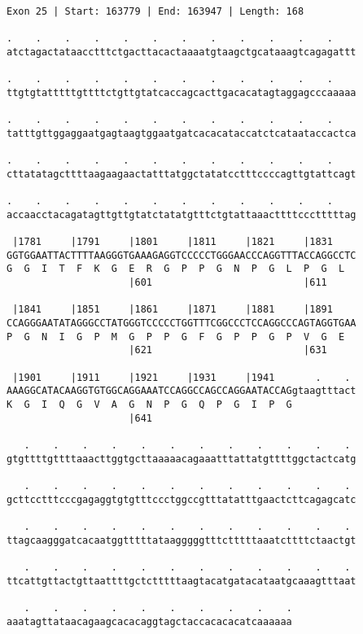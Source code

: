\documentclass{article}
\begin{document}
\newpage
\begin{Verbatim}
Exon 25 | Start: 163779 | End: 163947 | Length: 168
 
.    .    .    .    .    .    .    .    .    .    .    .    
atctagactataacctttctgacttacactaaaatgtaagctgcataaagtcagagattt
  
.    .    .    .    .    .    .    .    .    .    .    .    
ttgtgtatttttgttttctgttgtatcaccagcacttgacacatagtaggagcccaaaaa
  
.    .    .    .    .    .    .    .    .    .    .    .    
tatttgttggaggaatgagtaagtggaatgatcacacataccatctcataataccactca
  
.    .    .    .    .    .    .    .    .    .    .    .    
cttatatagcttttaagaagaactatttatggctatatcctttccccagttgtattcagt
  
.    .    .    .    .    .    .    .    .    .    .    .    
accaacctacagatagttgttgtatctatatgtttctgtattaaacttttccctttttag
  
 |1781     |1791     |1801     |1811     |1821     |1831    
GGTGGAATTACTTTTAAGGGTGAAAGAGGTCCCCCTGGGAACCCAGGTTTACCAGGCCTC
G  G  I  T  F  K  G  E  R  G  P  P  G  N  P  G  L  P  G  L  
                     |601                          |611     
  
 |1841     |1851     |1861     |1871     |1881     |1891    
CCAGGGAATATAGGGCCTATGGGTCCCCCTGGTTTCGGCCCTCCAGGCCCAGTAGGTGAA
P  G  N  I  G  P  M  G  P  P  G  F  G  P  P  G  P  V  G  E  
                     |621                          |631     
  
 |1901     |1911     |1921     |1931     |1941       .    . 
AAAGGCATACAAGGTGTGGCAGGAAATCCAGGCCAGCCAGGAATACCAGgtaagtttact
K  G  I  Q  G  V  A  G  N  P  G  Q  P  G  I  P  G           
                     |641                                   
  
   .    .    .    .    .    .    .    .    .    .    .    . 
gtgttttgttttaaacttggtgcttaaaaacagaaatttattatgttttggctactcatg
  
   .    .    .    .    .    .    .    .    .    .    .    . 
gcttcctttcccgagaggtgtgtttccctggccgtttatatttgaactcttcagagcatc
  
   .    .    .    .    .    .    .    .    .    .    .    . 
ttagcaagggatcacaatggtttttataagggggtttctttttaaatcttttctaactgt
  
   .    .    .    .    .    .    .    .    .    .    .    . 
ttcattgttactgttaattttgctctttttaagtacatgatacataatgcaaagtttaat
  
   .    .    .    .    .    .    .    .    .    .
aaatagttataacagaagcacacaggtagctaccacacacatcaaaaaa
\end{Verbatim}
\end{document}
